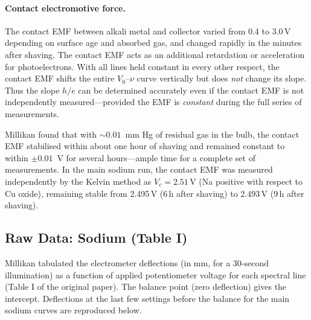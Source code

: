 \documentclass[12pt]{article}
\begin{document}
\paragraph{Contact electromotive force.}  The contact EMF between alkali
metal and collector varied from 0.4 to 3.0\,V depending on surface age and
absorbed gas, and changed rapidly in the minutes after shaving.  The contact
EMF acts as an additional retardation or acceleration for photoelectrons.
With all lines held constant in every other respect, the contact EMF shifts the
entire $V_0$--$\nu$ curve vertically but does \emph{not} change its slope.
Thus the slope $h/e$ can be determined accurately even if the contact EMF is
not independently measured---provided the EMF is \emph{constant} during the
full series of measurements.

Millikan found that with $\sim 0.01$~mm Hg of residual gas in the bulb,
the contact EMF stabilised within about one hour of shaving and remained
constant to within $\pm 0.01$~V for several hours---ample time for a
complete set of measurements.  In the main sodium run, the contact EMF
was measured independently by the Kelvin method as $V_c = 2.51$\,V
(Na positive with respect to Cu oxide), remaining stable from
2.495\,V (6\,h after shaving) to 2.493\,V (9\,h after shaving).

\subsection{Raw Data: Sodium (Table I)}

Millikan tabulated the electrometer deflections (in mm, for a 30-second
illumination) as a function of applied potentiometer voltage for each
spectral line (Table I of the original paper).  The balance point
(zero deflection) gives the intercept.  Deflections at the last few settings
before the balance for the main sodium curves are reproduced below.
\end{document}
